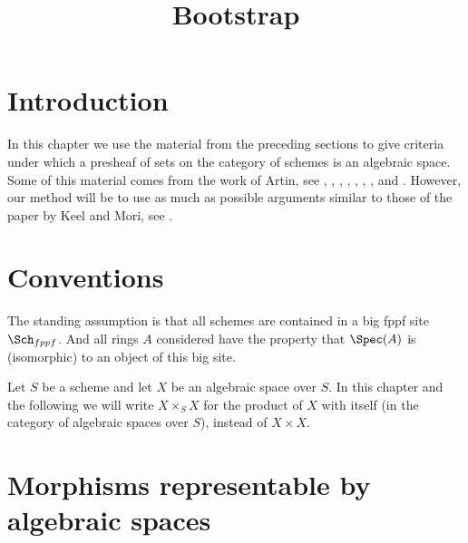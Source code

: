 

%


\title{Bootstrap}

\maketitle

\label{section-phantom}

\tableofcontents




\section{Introduction}
\label{section-introduction}

\noindent
In this chapter we use the material from the preceding sections to
give criteria under which a presheaf of sets on the category of schemes
is an algebraic space. Some of this material comes from the work
of Artin, see \cite{ArtinI}, \cite{ArtinII},
\cite{Artin-Theorem-Representability},
\cite{Artin-Construction-Techniques},
\cite{Artin-Algebraic-Spaces},
\cite{Artin-Algebraic-Approximation},
\cite{Artin-Implicit-Function},
and \cite{ArtinVersal}.
However, our method will be to use as much as possible arguments
similar to those of the paper by Keel and Mori, see
\cite{K-M}.

\section{Conventions}
\label{section-conventions}

\noindent
The standing assumption is that all schemes are contained in
a big fppf site $\Sch_{fppf}$. And all rings $A$ considered
have the property that $\Spec(A)$ is (isomorphic) to an
object of this big site.

\medskip\noindent
Let $S$ be a scheme and let $X$ be an algebraic space over $S$.
In this chapter and the following we will write $X \times_S X$
for the product of $X$ with itself (in the category of algebraic
spaces over $S$), instead of $X \times X$.




\section{Morphisms representable by algebraic spaces}
\label{section-morphism-representable-by-spaces}


